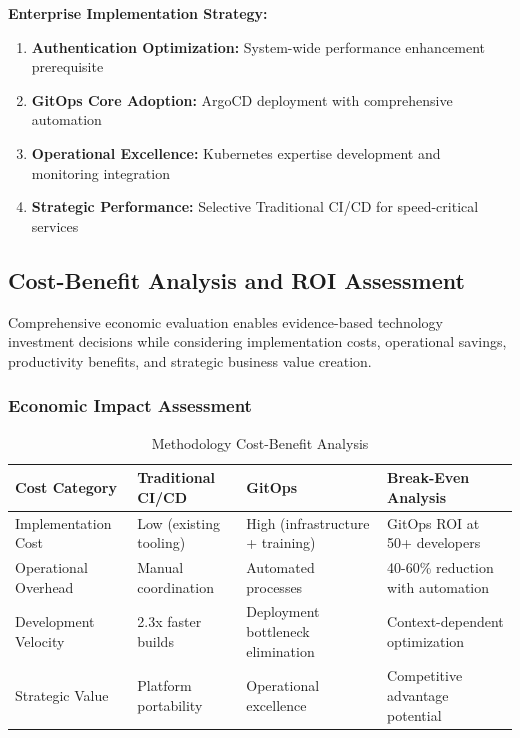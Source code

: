 \textbf{Enterprise Implementation Strategy:}
\begin{enumerate}
\item \textbf{Authentication Optimization:} System-wide performance enhancement prerequisite
\item \textbf{GitOps Core Adoption:} ArgoCD deployment with comprehensive automation
\item \textbf{Operational Excellence:} Kubernetes expertise development and monitoring integration
\item \textbf{Strategic Performance:} Selective Traditional CI/CD for speed-critical services
\end{enumerate}

\subsection{Cost-Benefit Analysis and ROI Assessment}
\label{subsec:cost_benefit_analysis}

Comprehensive economic evaluation enables evidence-based technology investment decisions while considering implementation costs, operational savings, productivity benefits, and strategic business value creation.

\subsubsection{Economic Impact Assessment}

\begin{table}[H]
\centering
\caption{Methodology Cost-Benefit Analysis}
\label{tab:cost_benefit}
\begin{tabular}{|p{3cm}|p{3.5cm}|p{3.5cm}|p{4cm}|}
\hline
\textbf{Cost Category} & \textbf{Traditional CI/CD} & \textbf{GitOps} & \textbf{Break-Even Analysis} \\
\hline
Implementation Cost & Low (existing tooling) & High (infrastructure + training) & GitOps ROI at 50+ developers \\
\hline
Operational Overhead & Manual coordination & Automated processes & 40-60\% reduction with automation \\
\hline
Development Velocity & 2.3x faster builds & Deployment bottleneck elimination & Context-dependent optimization \\
\hline
Strategic Value & Platform portability & Operational excellence & Competitive advantage potential \\
\hline
\end{tabular}
\end{table}

